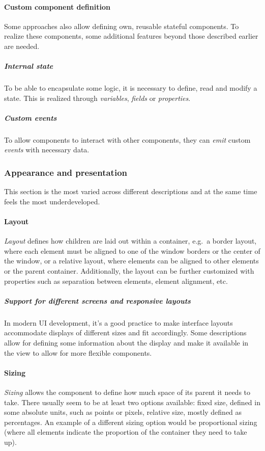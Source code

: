\paragraph{Custom component definition}
Some approaches also allow defining own, reusable stateful components.
To realize these components, some additional features beyond those described earlier are needed.

\subparagraph{Internal state}
To be able to encapsulate some logic, it is necessary to define, read and modify a state.
This is realized through \emph{variables}, \emph{fields} or \emph{properties}.

\subparagraph{Custom events}
To allow components to interact with other components, they can \emph{emit} custom \emph{events} with necessary data.

\subsubsection{Appearance and presentation}
This section is the most varied across different descriptions and at the same time feels the most underdeveloped.

\paragraph{Layout}
\emph{Layout} defines how children are laid out within a container, e.g.\ a border layout, where each element must be aligned to one of the window borders or the center of the window, or a relative layout, where elements can be aligned to other elements or the parent container.
Additionally, the layout can be further customized with properties such as separation between elements, element alignment, etc.

\subparagraph{Support for different screens and responsive layouts}
In modern UI development, it's a good practice to make interface layouts accommodate displays of different sizes and fit accordingly.
Some descriptions allow for defining some information about the display and make it available in the view to allow for more flexible components.

\paragraph{Sizing}
\emph{Sizing} allows the component to define how much space of its parent it needs to take.
There usually seem to be at least two options available: fixed size, defined in some absolute units, such as points or pixels, relative size, mostly defined as percentages.
An example of a different sizing option would be proportional sizing (where all elements indicate the proportion of the container they need to take up).

